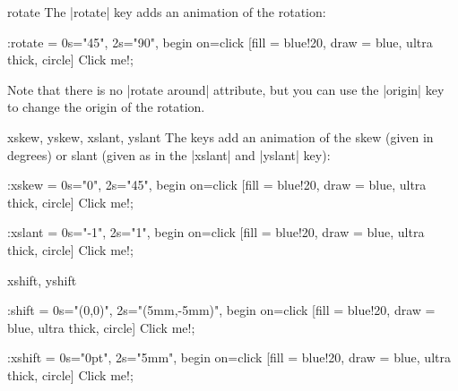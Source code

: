 \begin{tikzanimateattribute}{rotate}
    The |rotate| key adds an animation of the rotation:
\begin{codeexample}[
    preamble={\usetikzlibrary{animations}},
    animation list={0.5,1,1.5,2},
]
\tikz \node :rotate = { 0s="45", 2s="90", begin on=click}
  [fill = blue!20, draw = blue, ultra thick, circle] {Click me!};
\end{codeexample}
    Note that there is no |rotate around| attribute, but you can use the
    |origin| key to change the origin of the rotation.
\end{tikzanimateattribute}

\begin{tikzanimateattribute}{xskew, yskew, xslant, yslant}
    The keys add an animation of the skew (given in degrees) or slant (given as
    in the |xslant| and |yslant| key):
\begin{codeexample}[
    preamble={\usetikzlibrary{animations}},
    animation list={0.5,1,1.5,2},
]
\tikz \node :xskew = { 0s="0", 2s="45", begin on=click}
  [fill = blue!20, draw = blue, ultra thick, circle] {Click me!};
\end{codeexample}
\begin{codeexample}[
    preamble={\usetikzlibrary{animations}},
    animation list={0.5,1,1.5,2},
]
\tikz \node :xslant = { 0s="-1", 2s="1", begin on=click}
  [fill = blue!20, draw = blue, ultra thick, circle] {Click me!};
\end{codeexample}
\end{tikzanimateattribute}

\begin{tikzanimateattribute}{xshift, yshift}
\begin{codeexample}[
    preamble={\usetikzlibrary{animations}},
    animation list={0.5,1,1.5,2},
]
\tikz \node :shift = { 0s="{(0,0)}", 2s="{(5mm,-5mm)}",
                       begin on=click}
  [fill = blue!20, draw = blue, ultra thick, circle] {Click me!};
\end{codeexample}

\begin{codeexample}[
    preamble={\usetikzlibrary{animations}},
    animation list={0.5,1,1.5,2},
]
\tikz \node :xshift = { 0s="0pt", 2s="5mm", begin on=click}
  [fill = blue!20, draw = blue, ultra thick, circle] {Click me!};
\end{codeexample}
\end{tikzanimateattribute}


